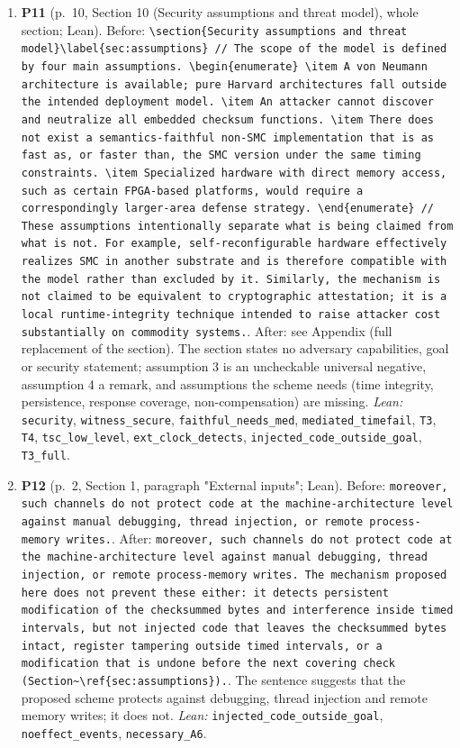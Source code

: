 \documentclass[9pt,twocolumn]{article}
\begin{document}
\begin{enumerate}[label=]
\item \textbf{P11} (p.~10, Section 10 (Security assumptions and threat model), whole section; Lean). Before: \texttt{\textbackslash{}section\{Security assumptions and threat model\}\textbackslash{}label\{sec:assumptions\} // The scope of the model is defined by four main assumptions. \textbackslash{}begin\{enumerate\}   \textbackslash{}item A von Neumann architecture is available; pure Harvard architectures fall   outside the intended deployment model.   \textbackslash{}item An attacker cannot discover and neutralize all embedded checksum   functions.   \textbackslash{}item There does not exist a semantics-faithful non-SMC implementation that is   as fast as, or faster than, the SMC version under the same timing constraints.   \textbackslash{}item Specialized hardware with direct memory access, such as certain FPGA-based   platforms, would require a correspondingly larger-area defense strategy. \textbackslash{}end\{enumerate\} // These assumptions intentionally separate what is being claimed from what is not. For example, self-reconfigurable hardware effectively realizes SMC in another substrate and is therefore compatible with the model rather than excluded by it. Similarly, the mechanism is not claimed to be equivalent to cryptographic attestation; it is a local runtime-integrity technique intended to raise attacker cost substantially on commodity systems.}. After: see Appendix (full replacement of the section). The section states no adversary capabilities, goal or security statement; assumption 3 is an uncheckable universal negative, assumption 4 a remark, and assumptions the scheme needs (time integrity, persistence, response coverage, non-compensation) are missing. \emph{Lean:} \texttt{security}, \texttt{witness\_secure}, \texttt{faithful\_needs\_med}, \texttt{mediated\_timefail}, \texttt{T3}, \texttt{T4}, \texttt{tsc\_low\_level}, \texttt{ext\_clock\_detects}, \texttt{injected\_code\_outside\_goal}, \texttt{T3\_full}. 
\item \textbf{P12} (p.~2, Section 1, paragraph "External inputs"; Lean). Before: \texttt{moreover, such channels do not protect code at the machine-architecture level against manual debugging, thread injection, or remote process-memory writes.}. After: \texttt{moreover, such channels do not protect code at the machine-architecture level against manual debugging, thread injection, or remote process-memory writes.  The mechanism proposed here does not prevent these either: it detects persistent modification of the checksummed bytes and interference inside timed intervals, but not injected code that leaves the checksummed bytes intact, register tampering outside timed intervals, or a modification that is undone before the next covering check (Section\~{}\textbackslash{}ref\{sec:assumptions\}).}. The sentence suggests that the proposed scheme protects against debugging, thread injection and remote memory writes; it does not. \emph{Lean:} \texttt{injected\_code\_outside\_goal}, \texttt{noeffect\_events}, \texttt{necessary\_A6}. 

\end{enumerate}
\end{document}
